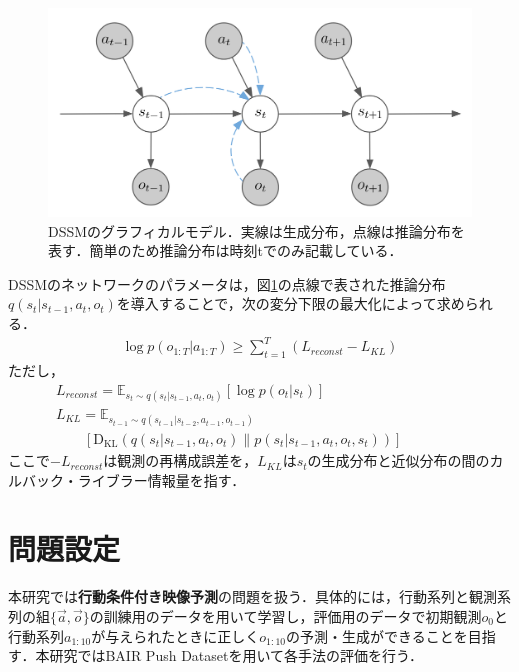 \documentclass[10pt, twocolumn]{jarticle}
\begin{document}
\begin{figure}[h]
  \begin{center}
    \includegraphics[width=0.8\linewidth]{./figures/dssm.png}
    \caption[DSSMのグラフィカルモデル]{\small DSSMのグラフィカルモデル．実線は生成分布，点線は推論分布を表す．簡単のため推論分布は時刻tでのみ記載している．}
    \label{fig:ssm}
  \end{center}
\end{figure}

DSSMのネットワークのパラメータは，図\ref{fig:ssm}の点線で表された推論分布$q(s_t|s_{t-1}, a_t, o_t)$を導入することで，次の変分下限の最大化によって求められる．
\small
\begin{eqnarray}
  \log p(o_{1:T}|a_{1:T}) \geq \sum_{t=1}^T ( {L}_{reconst} - {L}_{KL}) 
\end{eqnarray}
ただし，
\begin{eqnarray}
  && {L}_{reconst} = \mathbb{E}_{s_t \sim q(s_t|s_{t-1}, a_t, o_t)} [\log p(o_t|s_t)] \nonumber \\
  && {L}_{KL} = \mathbb{E}_{s_{t-1} \sim q(s_{t-1}|s_{t-2}, a_{t-1}, o_{t-1})} \nonumber \\
  && \hspace{2em} [\mathrm{D_{KL}}(q(s_t|s_{t-1}, a_t, o_t) \| p(s_t|s_{t-1}, a_t, o_t, s_t))] \hspace{6em} \nonumber
  \label{eq:dssm_elbo}  
\end{eqnarray}
\normalsize
ここで$ - L_{reconst}$は観測の再構成誤差を，$L_{KL}$は$s_t$の生成分布と近似分布の間のカルバック・ライブラー情報量を指す．

\section{問題設定}
本研究では{\bf 行動条件付き映像予測}の問題を扱う．具体的には，行動系列と観測系列の組$\{\vec{a},\vec{o}\}$の訓練用のデータを用いて学習し，評価用のデータで初期観測$o_0$と行動系列$a_{1:10}$が与えられたときに正しく$o_{1:10}$の予測・生成ができることを目指す．本研究ではBAIR Push Dataset\cite{ebert2017selfsupervised}を用いて各手法の評価を行う．
\end{document}
